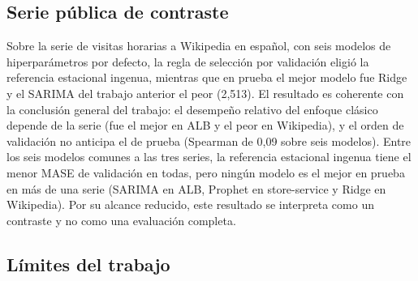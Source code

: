 \subsection{Serie pública de contraste}

Sobre la serie de visitas horarias a Wikipedia en español, con seis modelos de hiperparámetros por defecto,
la regla de selección por validación eligió la referencia estacional ingenua, mientras que en prueba el mejor
modelo fue Ridge y el SARIMA del trabajo anterior el peor (2,513). El resultado es
coherente con la conclusión general del trabajo: el desempeño relativo del enfoque clásico depende de la
serie (fue el mejor en ALB y el peor en Wikipedia), y el orden de validación no anticipa el de prueba (Spearman
de 0,09 sobre seis modelos). Entre los seis modelos comunes a las tres series, la referencia estacional ingenua tiene el menor MASE de validación en todas, pero
ningún modelo es el mejor en prueba en más de una serie (SARIMA en ALB, Prophet en store-service y Ridge en Wikipedia). Por su alcance
reducido, este resultado se interpreta como un contraste y no como una evaluación completa.

\subsection{Límites del trabajo}

